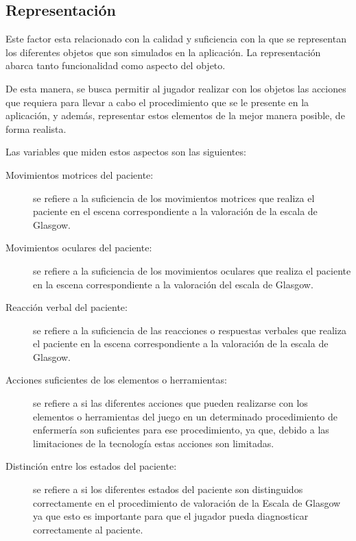 \subsection{Representación}

Este factor esta relacionado con la calidad y suficiencia con la que se
representan los diferentes objetos que son simulados en la aplicación. La
representación abarca tanto funcionalidad como aspecto del objeto.

De esta manera, se busca permitir al jugador realizar con los objetos las
acciones que requiera para llevar a cabo el procedimiento que se le presente en
la aplicación, y además, representar estos elementos de la mejor manera posible,
de forma realista.

Las variables que miden estos aspectos son las siguientes:

\begin{description}

\item [Movimientos motrices del paciente:] se refiere a la suficiencia de los
    movimientos motrices que realiza el paciente en el escena correspondiente a
    la valoración de la escala de Glasgow.

\item [Movimientos oculares del paciente:] se refiere a la suficiencia de los
    movimientos oculares que realiza el paciente en la escena correspondiente a
    la valoración del escala de Glasgow.

\item [Reacción verbal del paciente:] se refiere a la suficiencia de las
    reacciones o respuestas verbales que realiza el paciente en la escena
    correspondiente a la valoración de la escala de Glasgow.

\item[Acciones suficientes de los elementos o herramientas:] se refiere a si las
    diferentes acciones que pueden realizarse con los elementos o herramientas
    del juego en un determinado procedimiento de enfermería son suficientes para
    ese procedimiento, ya que, debido a las limitaciones de la tecnología estas
    acciones son limitadas.

\item[Distinción entre los estados del paciente:] se refiere a si los diferentes
    estados del paciente son distinguidos correctamente en el procedimiento de
    valoración de la Escala de Glasgow ya que esto es importante para que el
    jugador pueda diagnosticar correctamente al paciente.

\end{description}

